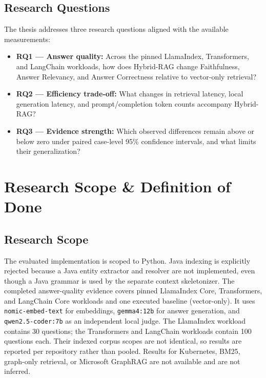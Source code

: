 \documentclass[12pt,letterpaper,oneside]{report}
\begin{document}
\subsection{Research Questions}
The thesis addresses three research questions aligned with the available measurements:
\begin{itemize}
    \item \textbf{RQ1 --- Answer quality:} Across the pinned LlamaIndex, Transformers, and LangChain workloads, how does Hybrid-RAG change Faithfulness, Answer Relevancy, and Answer Correctness relative to vector-only retrieval?
    \item \textbf{RQ2 --- Efficiency trade-off:} What changes in retrieval latency, local generation latency, and prompt/completion token counts accompany Hybrid-RAG?
    \item \textbf{RQ3 --- Evidence strength:} Which observed differences remain above or below zero under paired case-level 95\% confidence intervals, and what limits their generalization?
\end{itemize}

\section{Research Scope \& Definition of Done}
\subsection{Research Scope}
The evaluated implementation is scoped to Python. Java indexing is explicitly rejected because a Java entity extractor and resolver are not implemented, even though a Java grammar is used by the separate context skeletonizer. The completed answer-quality evidence covers pinned LlamaIndex Core, Transformers, and LangChain Core workloads and one executed baseline (vector-only). It uses \texttt{nomic-embed-text} for embeddings, \texttt{gemma4:12b} for answer generation, and \texttt{qwen2.5-coder:7b} as an independent local judge. The LlamaIndex workload contains 30 questions; the Transformers and LangChain workloads contain 100 questions each. Their indexed corpus scopes are not identical, so results are reported per repository rather than pooled. Results for Kubernetes, BM25, graph-only retrieval, or Microsoft GraphRAG are not available and are not inferred.
\end{document}
